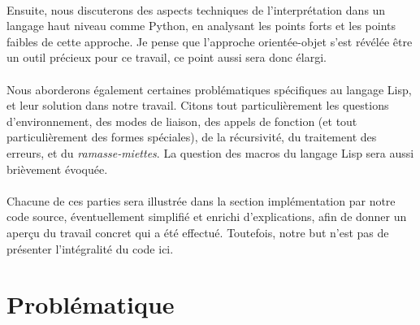 \documentclass{article}
\begin{document}
\paragraph{}
Ensuite, nous discuterons des aspects techniques de l'interprétation dans un langage haut niveau comme Python,
en analysant les points forts et les points faibles de cette approche.
Je pense que l'approche orientée-objet s'est révélée être un outil précieux pour ce travail, ce point aussi sera donc élargi.
\paragraph{}
Nous aborderons également certaines problématiques spécifiques au langage Lisp, et leur solution dans notre travail.
Citons tout particulièrement les questions d'environnement, des modes de liaison, des appels de fonction 
(et tout particulièrement des formes spéciales), de la récursivité, du traitement des erreurs,
et du \emph{ramasse-miettes}.
La question des macros du langage Lisp sera aussi brièvement évoquée.
\paragraph{}
Chacune de ces parties sera illustrée dans la section implémentation par notre code source, 
éventuellement simplifié et enrichi d'explications, afin de donner un aperçu du travail concret qui a été effectué.
Toutefois, notre but n'est pas de présenter l'intégralité du code ici.


\section{Problématique}
\end{document}
